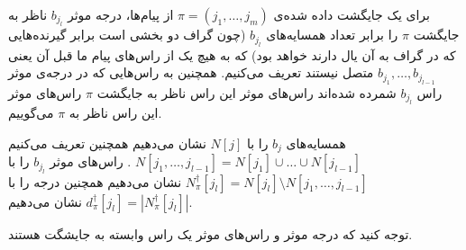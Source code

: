 \begin{definition}
	برای یک جایگشت داده شده‌ی 
	$\pi = (j_1, \ldots, j_m)$
	از پیام‌ها، درجه موثر
	$b_{j_l}$
	ناظر به جایگشت 
	$\pi$
	را برابر تعداد همسایه‌های 
	$b_{j_l}$
	(چون گراف دو بخشی است برابر گیرنده‌هایی که در گراف به آن یال دارند خواهد بود)	که به هیچ یک از راس‌‌های پیام ما قبل آن یعنی
	$b_{j_1}, \ldots, b_{j_{l - 1}}$
	متصل نیستند تعریف می‌کنیم. همچنین به راس‌هایی که در درجه‌ی موثر راس
		$b_{j_l}$
		شمرده شده‌اند راس‌های موثر این راس ناظر به جایگشت
		$\pi$
		راس‌های موثر این راس ناظر به
		$\pi$
		 می‌گوییم.
		 
		 همسایه‌های
		 $b_j$
		 را با
		 $N[j]$
		 نشان می‌دهیم همچنین تعریف می‌کنیم
		 $N[j_1, \ldots, j_{l - 1}] = N[j_1] \cup \ldots \cup N[j_{l - 1}]$
		 . راس‌های موثر
 		$b_{j_l}$
 		را با
 		$N^\dagger_\pi [j_l] = N[j_l] \setminus N[j_1, \ldots, j_{l - 1}]$
 		نشان می‌دهیم همچنین درجه را با
 		$d^\dagger_\pi[j_l] = |N^\dagger_\pi [j_l] |$
 		نشان می‌دهیم.
\end{definition}

توجه کنید که درجه موثر و راس‌های موثر یک راس وابسته به جایشگت هستند.

